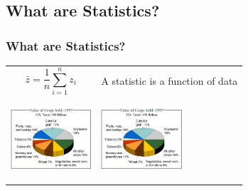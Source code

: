 \documentclass[mathserif,compress]{beamer}
\def\bdm{\begin{displaymath}}
\def\edm{\end{displaymath}}
\begin{document}

\subsection{What are Statistics?}
\begin{frame} 
\frametitle{What are Statistics?}
     
	\begin{tabular} {p{5.8cm} p{3.8cm}}

			{\bdm
				\bar{z} = \frac{1}{n}\sum_{i = 1}^n z_i 
			\edm} &
			\vspace{.2cm}
			{A statistic is a function of data} 
		  \\
		
		\begin{center}
		  \vspace{-.5cm}
			\includegraphics[width=3.0cm]{pieChart.jpeg} 
		  \vspace{.5cm}
		\end{center} &
		\begin{center}
		  \vspace{-.5cm}
			\includegraphics[width=3.0cm]{pieChart.jpeg} 
		  \vspace{.5cm}
		\end{center} 
		

	\end{tabular}

\end{frame}
 
\end{document}
